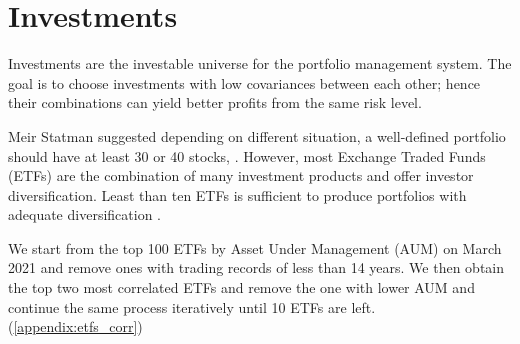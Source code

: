 \section{Investments}
Investments are the investable universe for the portfolio management system. The goal is to choose investments with low covariances between each other; hence their combinations can yield better profits from the same risk level\cite{willenbrock2011diversification}. 
\par 
Meir Statman suggested depending on different situation, a well-defined portfolio should have at least 30 or 40 stocks,  \cite{statman1987many}. However, most Exchange Traded Funds (ETFs) are the combination of many investment products and offer investor diversification. Least than ten ETFs is sufficient to produce portfolios with adequate diversification \cite{chang_2016}.
\par
We start from the top 100 ETFs by Asset Under Management (AUM) on March 2021 and remove ones with trading records of less than 14 years. We then obtain the top two most correlated ETFs and remove the one with lower AUM and continue the same process iteratively until 10 ETFs are left.  (\autoref{appendix:etfs_corr})
\par



